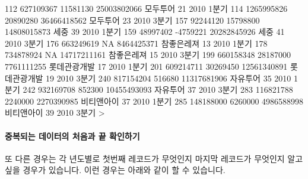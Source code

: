 \documentclass[tutorial.tex]{subfiles}
\begin{document}
\begin{Schunk}
\begin{Soutput}
112  627109367   11581130 25003802066     모두투어   21 2010 1분기
114 1265995826   20890280 36466418562     모두투어   23 2010 3분기
157   92244120   15798800 14808015873         세중   39 2010 1분기
159   48997402   -4759221 20282845926         세중   41 2010 3분기
176  663249619         NA  8464425371   참좋은레져   13 2010 1분기
178  734878924         NA 14717211161   참좋은레져   15 2010 3분기
199  660158348   28187000  7761111255 롯데관광개발   17 2010 1분기
201  609214711   30269450 12561340891 롯데관광개발   19 2010 3분기
240  817154204     516680 11317681906     자유투어   35 2010 1분기
242  932169708     852300 10455493093     자유투어   37 2010 3분기
283  116821788    2240000  2270390985   비티앤아이   37 2010 1분기
285  148188000    6260000  4986588998   비티앤아이   39 2010 3분기
> 
\end{Soutput}
\end{Schunk}

\paragraph{중복되는 데이터의 처음과 끝 확인하기}
또 다른 경우는 각 년도별로 첫번째 레코드가 무엇인지 마지막 레코드가 무엇인지 알고 싶을 경우가 있습니다. 
이런 경우는 아래와 같이 할 수 있습니다. 
\end{document}

